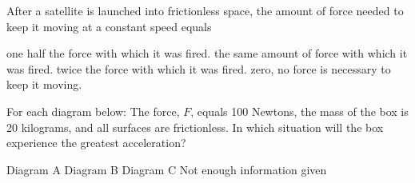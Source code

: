 \documentclass[]{exam}
\begin{document}
\begin{questions}
\question 
After a satellite is launched into frictionless space, the amount of force needed to keep it moving at a constant speed equals

\begin{randomizechoices}
    \choice one half the force with which it was fired.	
    \choice the same amount of force with which it was fired.
    \choice twice the force with which it was fired.	
    \correctchoice zero, no force is necessary to keep it moving.
\end{randomizechoices}

\question
For each diagram below: The force, $F$, equals 100 Newtons, the mass of the box is 20 kilograms, and all surfaces are frictionless. In which situation will the box experience the greatest acceleration?

\begin{center}
\hspace{1cm}
\hspace{1cm}
\end{center}

\begin{randomizeoneparchoices}[norandomize]
    \choice Diagram A
    \correctchoice Diagram B
    \choice Diagram C
    \choice Not enough information given
\end{randomizeoneparchoices}


\end{questions}
\end{document}
